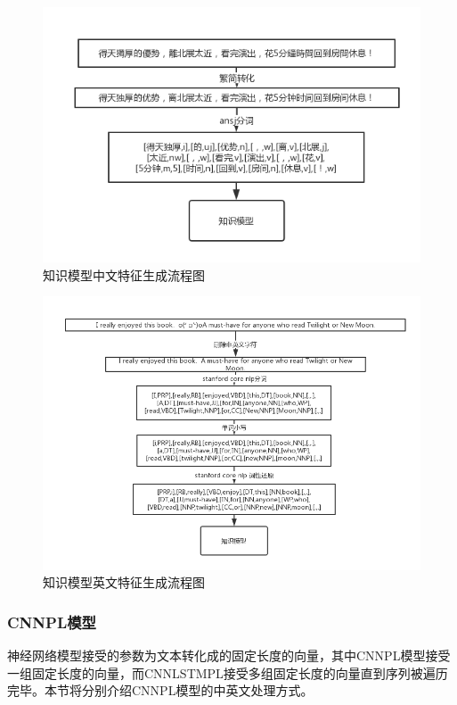 \begin{figure}[!htbp]
\begin{center}
\includegraphics[width=\textwidth]{graphic/preprocesskzh.png}
\caption{知识模型中文特征生成流程图 \label{fig:preprocesskzh}}
\end{center}
\end{figure}


\begin{figure}[!htbp]
\begin{center}
\includegraphics[width=\textwidth]{graphic/preprocessken.png}
\caption{知识模型英文特征生成流程图 \label{fig:preprocessken}}
\end{center}
\end{figure}

\subsubsection{CNNPL模型}
神经网络模型接受的参数为文本转化成的固定长度的向量，其中CNNPL模型接受一组固定长度的向量，而CNNLSTMPL接受多组固定长度的向量直到序列被遍历完毕。本节将分别介绍CNNPL模型的中英文处理方式。


